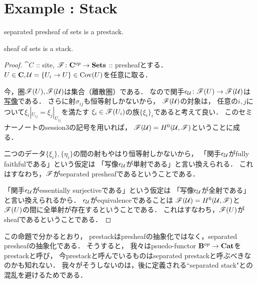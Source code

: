 \documentclass[a4paper]{jsarticle}
\begin{document}
\section{Example : Stack}
\begin{Prop}
    \begin{myenum}
        \item separated presheaf of sets is a prestack.
        \item sheaf of sets is a stack.
    \end{myenum}
\end{Prop}
\begin{proof}
    $\cat{C}$ :: site, $\mathscr{F} \colon \mathbf{C}^{op} \to \mathbf{Sets}$ :: presheafとする．
    $U \in \mathbf{C}, \mathcal{U}=\{U_i \to U\} \in \operatorname{Cov}(U)$を任意に取る．

    今，圏$\mathscr{F}(U), \mathscr{F}(\mathcal{U})$は集合（離散圏）である．
    なので関手$\epsilon_{\mathcal{U}} \colon \mathscr{F}(U) \to \mathscr{F}(\mathcal{U})$は\underline{写像}である．
    さらに射$\sigma_{ij}$も恒等射しかないから，
    $\mathscr{F}(\mathcal{U})$の対象は，
    任意の$i,j$について$\xi_i|_{U_{ij}}=\xi_j|_{U_{ij}}$を満たす
    $\xi_i \in \mathscr{F}(U_i)$の族$\{\xi_i\}_i$であると考えて良い．
    このセミナーノートのsession3の記号を用いれば，
    $\mathscr{F}(\mathcal{U})=H^0(\mathcal{U}, \mathscr{F})$ということに成る．

    二つのデータ$\{\xi_i\}, \{\eta_i\}$の間の射もやはり恒等射しかないから，
    「関手$\epsilon_{\mathcal{U}}$がfully faithfulである」という仮定は
    「写像$\epsilon_{\mathcal{U}}$が単射である」と言い換えられる．
    これはすなわち，$\mathscr{F}$がseparated presheafであるということである．

    「関手$\epsilon_{\mathcal{U}}$がessentially surjectiveである」という仮定は
    「写像$\epsilon_{\mathcal{U}}$が全射である」と言い換えられるから．
    $\epsilon_{\mathcal{U}}$がequivalenceであることは
    $\mathscr{F}(\mathcal{U})=H^0(\mathcal{U}, \mathscr{F})$と$\mathscr{F}(U)$の間に全単射が存在するということである．
    これはすなわち，$\mathscr{F}(U)$がsheafであるということである．
\end{proof}

\begin{Remark}
    この命題で分かるとおり，
    prestackはpresheafの抽象化ではなく，separated presheafの抽象化である．
    そうすると，
    我々はpsuedo-functor $\mathbf{B}^{op} \to \mathbf{Cat}$をprestackと呼び，
    今prestackと呼んでいるものはseparated prestackと呼ぶべきなのかも知れない．
    我々がそうしないのは，後に定義される``separated stack"との混乱を避けるためである．
\end{Remark}
\end{document}
